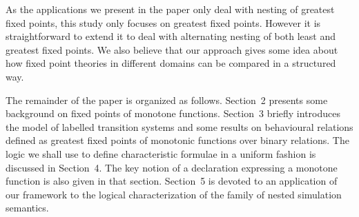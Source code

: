 \documentclass[submission]{eptcs}
\begin{document}
As the applications we present in the paper only deal with nesting of
greatest fixed points, this study only focuses on greatest fixed
points. However it is straightforward to extend it to deal with
alternating nesting of both least and greatest fixed points.  We also
believe that our approach gives some idea about how fixed point
theories in different domains can be compared in a structured way.

The remainder of the paper is organized as follows. Section~2 presents
some background on fixed points of monotone functions. Section~3
briefly introduces the model of labelled transition systems and some
results on behavioural relations defined as greatest fixed points of
monotonic functions over binary relations. The logic we shall use to
define characteristic formulae in a uniform fashion is discussed in
Section~4. The key notion of a declaration expressing a monotone
function is also given in that section. Section~5 is devoted to an
application of our framework to the logical characterization of the
family of nested simulation semantics.
\end{document}
